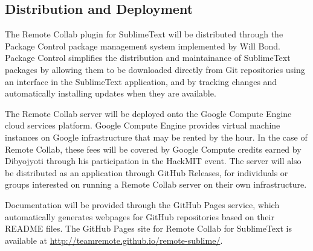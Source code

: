 \documentclass[11pt,english]{article}
\begin{document}
	\subsection{Distribution and Deployment}
	\label{sub:dist}
		The Remote Collab plugin for SublimeText will be distributed through the Package Control\cite{packagecontrol} package management system implemented by Will Bond. Package Control simplifies the distribution and maintainance of SublimeText packages by allowing them to be downloaded directly from Git repositories using an interface in the SublimeText application, and by tracking changes and automatically installing updates when they are available.

		The Remote Collab server will be deployed onto the Google Compute Engine\cite{googlecompute} cloud services platform. Google Compute Engine provides virtual machine instances on Google infrastructure that may be rented by the hour. In the case of Remote Collab, these fees will be covered by Google Compute credits earned by Dibyojyoti through his participation in the HackMIT event. The server will also be distributed as an application through GitHub Releases, for individuals or groups interested on running a Remote Collab server on their own infrastructure.

		Documentation will be provided through the GitHub Pages\cite{gh-pages} service, which automatically generates webpages for GitHub repositories based on their README files. The GitHub Pages site for Remote Collab for SublimeText is available at \url{http://teamremote.github.io/remote-sublime/}.
	\pagebreak
	
	
\end{document}
